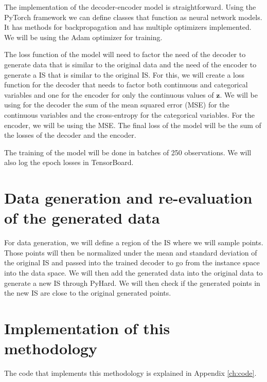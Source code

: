The implementation of the decoder-encoder model is straightforward. Using the PyTorch \cite{paszke2019pytorch} framework we can define classes that function as neural network models. It has methods for backpropagation and has multiple optimizers implemented. We will be using the Adam optimizer \cite{kingma2017adam} for training.

The loss function of the model will need to factor the need of the decoder to generate data that is similar to the original data and the need of the encoder to generate a IS that is similar to the original IS. For this, we will create a loss function for the decoder that needs to factor both continuous and categorical variables and one for the encoder for only the continuous values of $\mathbf{z}$. We will be using for the decoder the sum of the mean squared error (MSE) for the continuous variables and the cross-entropy for the categorical variables. For the encoder, we will be using the MSE. The final loss of the model will be the sum of the losses of the decoder and the encoder.

The training of the model will be done in batches of 250 observations. We will also log the epoch losses in TensorBoard.

\section{Data generation and re-evaluation of the generated data}

For data generation, we will define a region of the IS where we will sample points. Those points will then be normalized under the mean and standard deviation of the original IS and passed into the trained decoder to go from the instance space into the data space. We will then add the generated data into the original data to generate a new IS through PyHard. We will then check if the generated points in the new IS are close to the original generated points.

\section{Implementation of this methodology}

The code that implements this methodology is explained in Appendix \ref{ch:code}.